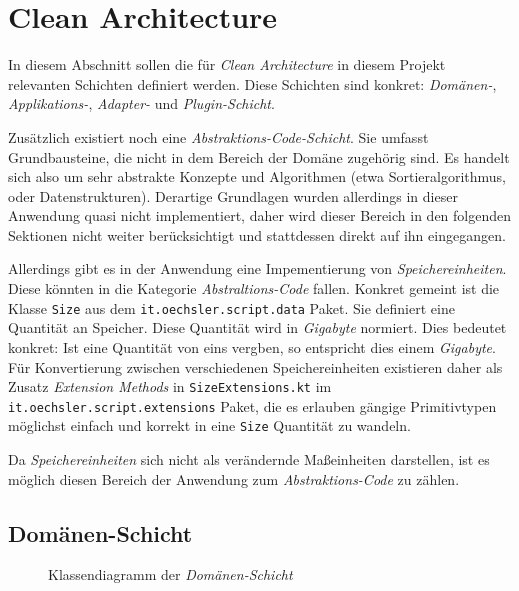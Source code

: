 \section{Clean Architecture}
\label{sec:clean_architecture}

In diesem Abschnitt sollen die für \emph{Clean Architecture} in diesem Projekt relevanten Schichten definiert werden.
Diese Schichten sind konkret: \emph{Domänen-}, \emph{Applikations-}, \emph{Adapter-} und \emph{Plugin-Schicht}.

Zusätzlich existiert noch eine \emph{Abstraktions-Code-Schicht}.
Sie umfasst Grundbausteine, die nicht in dem Bereich der Domäne zugehörig sind.
Es handelt sich also um sehr abstrakte Konzepte und Algorithmen (etwa Sortieralgorithmus, oder Datenstrukturen).
Derartige Grundlagen wurden allerdings in dieser Anwendung quasi nicht implementiert, daher wird dieser Bereich in den folgenden Sektionen nicht weiter berücksichtigt und stattdessen direkt auf ihn eingegangen.

Allerdings gibt es in der Anwendung eine Impementierung von \emph{Speichereinheiten}.
Diese könnten in die Kategorie \emph{Abstraltions-Code} fallen.
Konkret gemeint ist die Klasse \texttt{Size} aus dem \texttt{it.oechsler.script.data} Paket.
Sie definiert eine Quantität an Speicher.
Diese Quantität wird in \emph{Gigabyte} normiert.
Dies bedeutet konkret: Ist eine Quantität von eins vergben, so entspricht dies einem \emph{Gigabyte}.
Für Konvertierung zwischen verschiedenen Speichereinheiten existieren daher als Zusatz \emph{Extension Methods} in \texttt{SizeExtensions.kt} im \texttt{it.oechsler.script.extensions} Paket, die es erlauben gängige Primitivtypen möglichst einfach und korrekt in eine \texttt{Size} Quantität zu wandeln.

Da \emph{Speichereinheiten} sich nicht als verändernde Maßeinheiten darstellen, ist es möglich diesen Bereich der Anwendung zum \emph{Abstraktions-Code} zu zählen.

\subsection{Domänen-Schicht}
\label{subsec:domaenen_schicht}

\begin{figure}[ht]
    \centering


    \caption{Klassendiagramm der \emph{Domänen-Schicht}}
    \label{fig:domain}
\end{figure}

